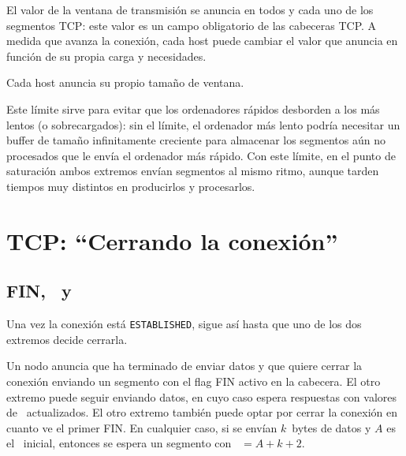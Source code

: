 El valor de la ventana de transmisión se anuncia en todos y cada uno de los segmentos TCP:
este valor es un campo obligatorio de las cabeceras TCP.
% 
A medida que avanza la conexión, cada host puede cambiar el valor que anuncia en función de
su propia carga y necesidades.

\begin{remark}
Cada host anuncia su propio tamaño de ventana.
\end{remark}


Este límite sirve para evitar que los ordenadores rápidos desborden a los más lentos (o sobrecargados):
sin el límite, el ordenador más lento podría necesitar un buffer de tamaño infinitamente creciente para almacenar los
segmentos aún no procesados que le envía el ordenador más rápido. Con este límite,
en el punto de saturación ambos extremos envían segmentos al mismo ritmo, aunque tarden tiempos
muy distintos en producirlos y procesarlos.

\section{TCP: ``Cerrando la conexión''}\label{sec:layer4:tcp_closing}

\subsection{FIN, \nseq\ y \nack}\label{sec:layer4:tcp_closing:fin_nseq_and_nack}

Una vez la conexión está \texttt{ESTABLISHED}, sigue así hasta que uno de los dos extremos decide
cerrarla.

Un nodo anuncia que ha terminado de enviar datos y que quiere cerrar la conexión enviando un
segmento con el flag FIN activo en la cabecera. El otro extremo puede seguir
enviando datos, en cuyo caso espera respuestas con valores de \nack\ actualizados. El otro extremo
también puede optar por cerrar la conexión en cuanto ve el primer FIN.
% 
En cualquier caso,
si se envían $k$~bytes de datos y $A$
es el \nseq\ inicial, entonces se espera un segmento con \nack\ $= A+k+2$.

\begin{center}
\end{center}

